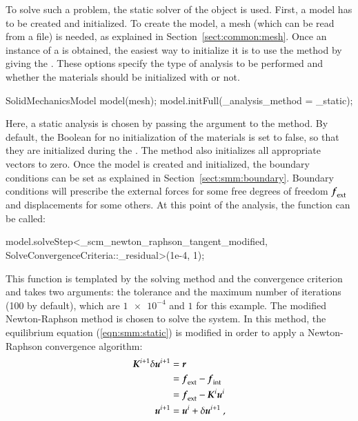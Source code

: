 To solve such a problem, the static solver of the
 object is used.
First, a model has to be created and initialized.  To create the
model, a mesh (which can be read from a file) is needed, as explained
in Section~\ref{sect:common:mesh}.  Once an instance of a
 is obtained, the easiest way to initialize
it is to use the 
method by giving the . These options
specify the type of analysis to be performed and whether the materials
should be initialized with  or not.
\begin{cpp}
SolidMechanicsModel model(mesh);
model.initFull(_analysis_method = _static);
\end{cpp}
Here, a static analysis is chosen by passing the argument
 to the method. By default, the Boolean for no
initialization of the materials is set to false, so that they are
initialized during the . The method 
also initializes all appropriate vectors to zero.  Once the model is
created and initialized, the boundary conditions can be set as
explained in Section~\ref{sect:smm:boundary}.  Boundary conditions
will prescribe the external forces for some free degrees of freedom
$\boldsymbol{f}_{{\mathrm{ext}}}$ and displacements for some others.  At this point
of the analysis, the function
 can be called:
\begin{cpp}
model.solveStep<_scm_newton_raphson_tangent_modified, SolveConvergenceCriteria::_residual>(1e-4, 1);
\end{cpp}
This function is templated by the solving method and the convergence
criterion and takes two arguments: the tolerance and the maximum
number of iterations (100 by default), which are $\num{1e-4}$ and $1$ for this example. The
modified Newton-Raphson method is chosen to solve the system. In this
method, the equilibrium equation (\ref{eqn:smm:static}) is modified in
order to apply a Newton-Raphson convergence algorithm:
\begin{align}\label{eqn:smm:static-newton-raphson}
  \boldsymbol{K}^{i+1}\delta\boldsymbol{u}^{i+1} &= \boldsymbol{r} \\
  &= \boldsymbol{f}_{{\mathrm{ext}}} -\boldsymbol{f}_{{\mathrm{int}}}\\
  &= \boldsymbol{f}_{{\mathrm{ext}}} - \boldsymbol{K}^{i} \boldsymbol{u}^{i}\\
  \boldsymbol{u}^{i+1} &= \boldsymbol{u}^{i} + \delta\boldsymbol{u}^{i+1}~,\nonumber
\end{align}

